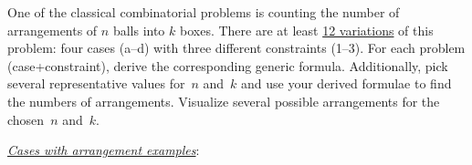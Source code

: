 \documentclass[a4paper,12pt]{article}
\begin{document}
\begin{tasks}[align=right,left=0pt]
    \newcommand{\drawBox}[3][]{%
        \begin{tikzpicture}[myboxstyle,scale=1.5,transform shape,#1]
            \drawBoxBack
            #3
            \drawBoxFront{#2}
        \end{tikzpicture}%
    }

    \newcommand{\newBall}{\stepcounter{balls}\theballs}
    \newcommand{\resetBalls}{\setcounter{balls}{0}}
    \renewcommand{\theballs}{\arabic{balls}} %

    \newcommand{\newBox}{\stepcounter{boxes}\theboxes}
    \newcommand{\resetBoxes}{\setcounter{boxes}{0}}
    \renewcommand{\theboxes}{\Alph{boxes}} %

    \newcommand{\drawBoxWithoutBalls}[1][]{%
        \drawBox[#1]{\newBox}{}}
    \newcommand{\drawBoxWithOneBall}[1][]{%
        \drawBox[#1]{\newBox}{
            \drawBallCenter{\newBall}
        }}
    \newcommand{\drawBoxWithTwoBalls}[1][]{%
        \drawBox[#1]{\newBox}{
            \drawBallThree{\newBall}
            \drawBallTwo{\newBall}
        }}
    \newcommand{\drawBoxWithThreeBalls}[1][]{%
        \drawBox[#1]{\newBox}{
            \drawBallOne{\newBall}
            \drawBallTwo{\newBall}
            \drawBallLowCenter{\newBall}
        }}
    \newcommand{\drawBoxWithFourBalls}[1][]{%
        \drawBox[#1]{\newBox}{
            \drawBallOne{\newBall}
            \drawBallTwo{\newBall}
            \drawBallThree{\newBall}
            \drawBallFour{\newBall}
        }}

    \item One of the classical combinatorial problems is counting the number of arrangements of $n$ balls into $k$ boxes.
    There are at least \href{https://en.wikipedia.org/wiki/Twelvefold_way}{12 variations} of this problem: four cases (a--d) with three different constraints (1--3).
    For each problem (case+constraint), derive the corresponding generic formula.
    Additionally, pick several representative values for~$n$ and~$k$ and use your derived formulae to find the numbers of arrangements.
    Visualize several possible arrangements for the chosen~$n$ and~$k$.

    \smallskip
    \textit{\uline{Cases with arrangement examples}}:


\end{tasks}
\end{document}
